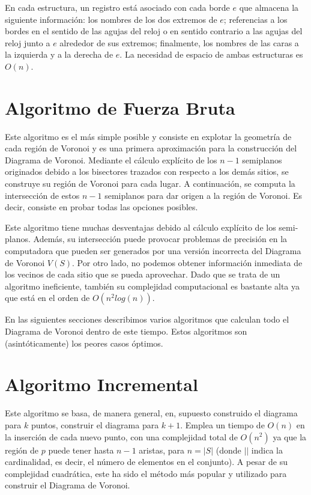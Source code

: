 \vspace{0.3cm}

En cada estructura, un registro está asociado con cada borde $e$ que almacena la siguiente información: los nombres de los dos extremos de $e$; referencias a los bordes en el sentido de las agujas del reloj o en sentido contrario a las agujas del reloj junto a $e$ alrededor de sus extremos; finalmente, los nombres de las caras a la izquierda y a la derecha de $e$. La necesidad de espacio de ambas estructuras es $O(n)$.

\section{Algoritmo de Fuerza Bruta}

Este algoritmo es el más simple posible y consiste en explotar la geometría de cada región de Voronoi y es una primera aproximación para la construcción del Diagrama de Voronoi. Mediante el cálculo explícito de los $n-1$ semiplanos originados debido a los bisectores trazados con respecto a los demás sitios, se construye su región de Voronoi para cada lugar. A continuación, se computa la intersección de estos $n-1$ semiplanos para dar origen a la región de Voronoi. Es decir, consiste en probar todas las opciones posibles.
\vspace{0.3cm}

Este algoritmo tiene muchas desventajas debido al cálculo explícito de los semi-planos. Además, su intersección puede provocar problemas de
precisión en la computadora que pueden ser generados por una versión incorrecta del Diagrama de Voronoi $V(S)$. Por otro lado, no podemos obtener información inmediata de los vecinos de cada sitio que se pueda aprovechar. Dado que se trata de un algoritmo ineficiente, también su complejidad computacional es bastante alta ya que está en el orden de $O(n^2log(n))$.
\vspace{0.3cm}

En las siguientes secciones describimos varios algoritmos que calculan todo el Diagrama de Voronoi dentro de este tiempo. Estos algoritmos son (asintóticamente) los peores casos óptimos.


\section{Algoritmo Incremental}\label{incremental}

Este algoritmo se basa, de manera general, en, supuesto construido el diagrama para $k$ puntos, construir el diagrama para $k+1$. Emplea un tiempo de $O(n)$ en la inserción de cada nuevo punto, con una complejidad total de $O(n^2)$ ya que la región de $p$ puede tener hasta $n-1$ aristas, para $n = |S|$ (donde $| |$ indica la cardinalidad, es decir, el número de elementos en el conjunto). A pesar de su complejidad cuadrática, este ha sido el método más popular y utilizado para construir el Diagrama de Voronoi.
\vspace{0.3cm}

